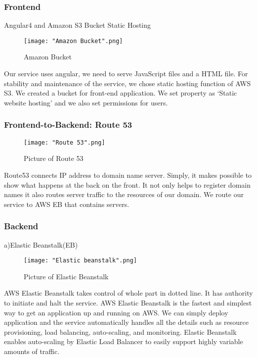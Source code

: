 \documentclass[10pt,journal,compsoc]{IEEEtran}
\begin{document}
\subsubsection{Frontend}
Angular4 and Amazon S3 Bucket Static Hosting

\begin{figure}[H]
\centering
\texttt{[image: "Amazon Bucket".png]}
{\caption*{Amazon Bucket}}
\end{figure}
Our service uses angular, we need to serve JavaScript files and a HTML file. For stability and maintenance of the service, we chose static hosting function of AWS S3. We created a bucket for front-end application. We set property as ‘Static website hosting’ and we also set permissions for users.

\subsubsection{Frontend-to-Backend: Route 53}

\begin{figure}[H]
\centering
\texttt{[image: "Route 53".png]}
{\caption*{Picture of Route 53}}
\end{figure}
Route53 connects IP address to domain name server. Simply, it makes possible to show what happens at the back on the front. It not only helps to register domain names it also routes server traffic to the resources of our domain. We route our service to AWS EB that contains servers.

\subsubsection{Backend}
\null\qquad a)Elastic Beanstalk(EB)

\begin{figure}[H]
\centering
\texttt{[image: "Elastic beanstalk".png]}
{\caption*{Picture of Elastic Beanstalk}}
\end{figure}
AWS Elastic Beanstalk takes control of whole part in dotted line. It has authority to initiate and halt the service. AWS Elastic Beanstalk is the fastest and simplest way to get an application up and running on AWS. We can simply deploy application and the service automatically handles all the details such as resource provisioning, load balancing, auto-scaling, and monitoring. Elastic Beanstalk enables auto-scaling by Elastic Load Balancer to easily support highly variable amounts of traffic.
\end{document}
